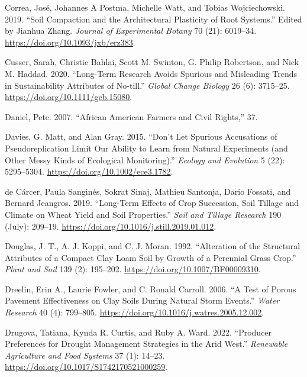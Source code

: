 \documentclass[
  12pt,
]{article}
\newlength{\cslhangindent}
\newlength{\cslentryspacingunit} %
\newenvironment{CSLReferences}[2] %
 {%
  \setlength{\parindent}{0pt}
  \ifodd #1
  \let\oldpar\par
  \def\par{\hangindent=\cslhangindent\oldpar}
  \fi
  \setlength{\parskip}{#2\cslentryspacingunit}
 }%
 {}
\begin{document}
\begin{CSLReferences}{1}{0}
\leavevmode{}%
Correa, José, Johannes A Postma, Michelle Watt, and Tobias Wojciechowski. 2019. {``Soil Compaction and the Architectural Plasticity of Root Systems.''} Edited by Jianhua Zhang. \emph{Journal of Experimental Botany} 70 (21): 6019--34. \url{https://doi.org/10.1093/jxb/erz383}.

\leavevmode{}%
Cusser, Sarah, Christie Bahlai, Scott M. Swinton, G. Philip Robertson, and Nick M. Haddad. 2020. {``Long-Term Research Avoids Spurious and Misleading Trends in Sustainability Attributes of No-till.''} \emph{Global Change Biology} 26 (6): 3715--25. \url{https://doi.org/10.1111/gcb.15080}.

\leavevmode{}%
Daniel, Pete. 2007. {``African {American Farmers} and {Civil Rights},''} 37.

\leavevmode{}%
Davies, G. Matt, and Alan Gray. 2015. {``Don't Let Spurious Accusations of Pseudoreplication Limit Our Ability to Learn from Natural Experiments (and Other Messy Kinds of Ecological Monitoring).''} \emph{Ecology and Evolution} 5 (22): 5295--5304. \url{https://doi.org/10.1002/ece3.1782}.

\leavevmode{}%
de Cárcer, Paula Sanginés, Sokrat Sinaj, Mathieu Santonja, Dario Fossati, and Bernard Jeangros. 2019. {``Long-Term Effects of Crop Succession, Soil Tillage and Climate on Wheat Yield and Soil Properties.''} \emph{Soil and Tillage Research} 190 (July): 209--19. \url{https://doi.org/10.1016/j.still.2019.01.012}.

\leavevmode{}%
Douglas, J. T., A. J. Koppi, and C. J. Moran. 1992. {``Alteration of the Structural Attributes of a Compact Clay Loam Soil by Growth of a Perennial Grass Crop.''} \emph{Plant and Soil} 139 (2): 195--202. \url{https://doi.org/10.1007/BF00009310}.

\leavevmode{}%
Dreelin, Erin A., Laurie Fowler, and C. Ronald Carroll. 2006. {``A Test of Porous Pavement Effectiveness on Clay Soils During Natural Storm Events.''} \emph{Water Research} 40 (4): 799--805. \url{https://doi.org/10.1016/j.watres.2005.12.002}.

\leavevmode{}%
Drugova, Tatiana, Kynda R. Curtis, and Ruby A. Ward. 2022. {``Producer Preferences for Drought Management Strategies in the Arid West.''} \emph{Renewable Agriculture and Food Systems} 37 (1): 14--23. \url{https://doi.org/10.1017/S1742170521000259}.


\end{CSLReferences}
\end{document}
